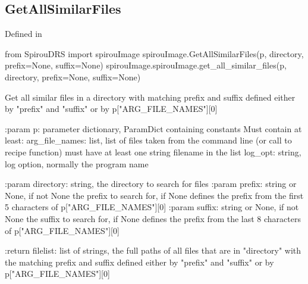 \noindent\begin{minipage}{\textwidth}
\subsection{GetAllSimilarFiles}

Defined in \spirouImage{}

\begin{pythonbox}
from SpirouDRS import spirouImage
spirouImage.GetAllSimilarFiles(p, directory, prefix=None, suffix=None)
spirouImage.spirouImage.get_all_similar_files(p, directory, prefix=None, suffix=None)
\end{pythonbox}

\begin{pythondocstring}
Get all similar files in a directory with matching prefix and suffix defined
either by "prefix" and "suffix" or by p["ARG_FILE_NAMES"][0]

:param p: parameter dictionary, ParamDict containing constants
    Must contain at least:
            arg_file_names: list, list of files taken from the command line
                            (or call to recipe function) must have at least
                            one string filename in the list
            log_opt: string, log option, normally the program name

:param directory: string, the directory to search for files
:param prefix: string or None, if not None the prefix to search for, if
               None defines the prefix from the first 5 characters of
               p["ARG_FILE_NAMES"][0]
:param suffix: string  or None, if not None the suffix to search for, if
               None defines the prefix from the last 8 characters of
               p["ARG_FILE_NAMES"][0]

:return filelist: list of strings, the full paths of all files that are in
                  "directory" with the matching prefix and suffix defined
                  either by "prefix" and "suffix" or by
                  p["ARG_FILE_NAMES"][0]
\end{pythondocstring}
\end{minipage}


